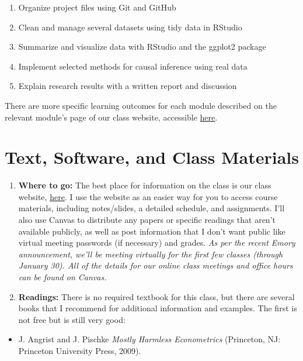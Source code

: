 \documentclass[11pt,]{article}
\providecommand{\tightlist}{%
  \setlength{\itemsep}{0pt}\setlength{\parskip}{0pt}}
\begin{document}
\begin{enumerate}
\def\labelenumi{\arabic{enumi}.}
\tightlist
\item
  Organize project files using Git and GitHub
\item
  Clean and manage several datasets using tidy data in RStudio
\item
  Summarize and visualize data with RStudio and the ggplot2 package
\item
  Implement selected methods for causal inference using real data
\item
  Explain research results with a written report and discussion
\end{enumerate}

There are more specific learning outcomes for each module described on
the relevant module's page of our class website, accessible
\href{https://econ470s22.classes.ianmccarthyecon.com/}{here}.

\hypertarget{text-software-and-class-materials}{%
\section{Text, Software, and Class
Materials}\label{text-software-and-class-materials}}

\begin{enumerate}
\def\labelenumi{\arabic{enumi}.}
\item
  \textbf{Where to go:} The best place for information on the class is
  our class website,
  \href{https://econ470s22.classes.ianmccarthyecon.com/}{here}. I use
  the website as an easier way for you to access course materials,
  including notes/slides, a detailed schedule, and assignments. I'll
  also use Canvas to distribute any papers or specific readings that
  aren't available publicly, as well as post information that I don't
  want public like virtual meeting passwords (if necessary) and grades.
  \emph{As per the recent Emory announcement, we'll be meeting virtually
  for the first few classes (through January 30). All of the details for
  our online class meetings and office hours can be found on Canvas.}
\item
  \textbf{Readings:} There is no required textbook for this class, but
  there are several books that I recommend for additional information
  and examples. The first is not free but is still very good:
\end{enumerate}

\begin{itemize}
\tightlist
\item
  J. Angrist and J. Pischke \emph{Mostly Harmless Econometrics}
  (Princeton, NJ: Princeton University Press, 2009).
\end{itemize}
\end{document}
